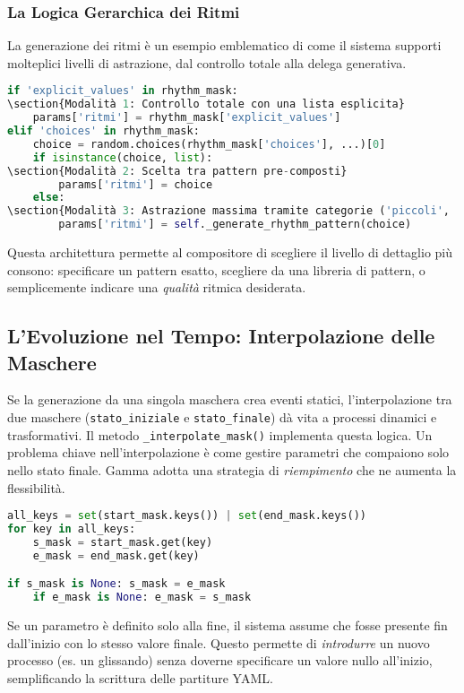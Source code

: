 \subsubsection{La Logica Gerarchica dei Ritmi}
La generazione dei ritmi è un esempio emblematico di come il sistema supporti molteplici livelli di astrazione, dal controllo totale alla delega generativa.

\begin{lstlisting}[language=Python]
if 'explicit_values' in rhythm_mask:
\section{Modalità 1: Controllo totale con una lista esplicita}
    params['ritmi'] = rhythm_mask['explicit_values']
elif 'choices' in rhythm_mask:
    choice = random.choices(rhythm_mask['choices'], ...)[0]
    if isinstance(choice, list):
\section{Modalità 2: Scelta tra pattern pre-composti}
        params['ritmi'] = choice
    else:
\section{Modalità 3: Astrazione massima tramite categorie ('piccoli', 'medi'...)}
        params['ritmi'] = self._generate_rhythm_pattern(choice)
\end{lstlisting}
Questa architettura permette al compositore di scegliere il livello di dettaglio più consono: specificare un pattern esatto, scegliere da una libreria di pattern, o semplicemente indicare una \textit{qualità} ritmica desiderata.
\subsection{L'Evoluzione nel Tempo: Interpolazione delle Maschere}
Se la generazione da una singola maschera crea eventi statici, l'interpolazione tra due maschere (\texttt{stato\_iniziale} e \texttt{stato\_finale}) dà vita a processi dinamici e trasformativi. Il metodo \texttt{\_interpolate\_mask()} implementa questa logica.
Un problema chiave nell'interpolazione è come gestire parametri che compaiono solo nello stato finale. Gamma adotta una strategia di \textit{riempimento} che ne aumenta la flessibilità.

\begin{lstlisting}[language=Python]
all_keys = set(start_mask.keys()) | set(end_mask.keys())
for key in all_keys:
    s_mask = start_mask.get(key)
    e_mask = end_mask.get(key)

if s_mask is None: s_mask = e_mask
    if e_mask is None: e_mask = s_mask
\end{lstlisting}
Se un parametro è definito solo alla fine, il sistema assume che fosse presente fin dall'inizio con lo stesso valore finale. Questo permette di \textit{introdurre} un nuovo processo (es. un glissando) senza doverne specificare un valore nullo all'inizio, semplificando la scrittura delle partiture YAML.
